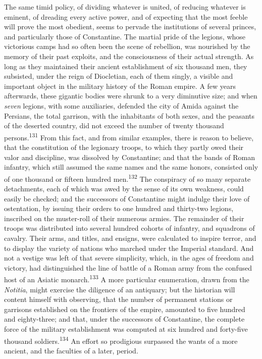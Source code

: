 The same timid policy, of dividing whatever is united, of
reducing whatever is eminent, of dreading every active power, and
of expecting that the most feeble will prove the most obedient,
seems to pervade the institutions of several princes, and
particularly those of Constantine. The martial pride of the
legions, whose victorious camps had so often been the scene of
rebellion, was nourished by the memory of their past exploits,
and the consciousness of their actual strength. As long as they
maintained their ancient establishment of six thousand men, they
subsisted, under the reign of Diocletian, each of them singly, a
visible and important object in the military history of the Roman
empire. A few years afterwards, these gigantic bodies were shrunk
to a very diminutive size; and when \textit{seven} legions, with some
auxiliaries, defended the city of Amida against the Persians, the
total garrison, with the inhabitants of both sexes, and the
peasants of the deserted country, did not exceed the number of
twenty thousand persons.\textsuperscript{131} From this fact, and from similar
examples, there is reason to believe, that the constitution of
the legionary troops, to which they partly owed their valor and
discipline, was dissolved by Constantine; and that the bands of
Roman infantry, which still assumed the same names and the same
honors, consisted only of one thousand or fifteen hundred men.\textsuperscript{132}
The conspiracy of so many separate detachments, each of which
was awed by the sense of its own weakness, could easily be
checked; and the successors of Constantine might indulge their
love of ostentation, by issuing their orders to one hundred and
thirty-two legions, inscribed on the muster-roll of their
numerous armies. The remainder of their troops was distributed
into several hundred cohorts of infantry, and squadrons of
cavalry. Their arms, and titles, and ensigns, were calculated to
inspire terror, and to display the variety of nations who marched
under the Imperial standard. And not a vestige was left of that
severe simplicity, which, in the ages of freedom and victory, had
distinguished the line of battle of a Roman army from the
confused host of an Asiatic monarch.\textsuperscript{133} A more particular
enumeration, drawn from the \textit{Notitia}, might exercise the
diligence of an antiquary; but the historian will content himself
with observing, that the number of permanent stations or
garrisons established on the frontiers of the empire, amounted to
five hundred and eighty-three; and that, under the successors of
Constantine, the complete force of the military establishment was
computed at six hundred and forty-five thousand soldiers.\textsuperscript{134} An
effort so prodigious surpassed the wants of a more ancient, and
the faculties of a later, period.

